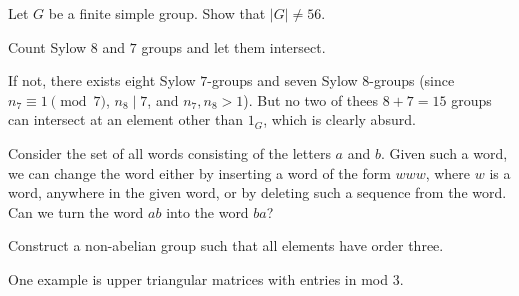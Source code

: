 \begin{problem}
	Let $G$ be a finite simple group.
	Show that $\left\lvert G \right\rvert \neq 56$.
	\begin{hint}
		Count Sylow $8$ and $7$ groups and let them intersect.
	\end{hint}
	\begin{sol}
		If not, there exists eight Sylow $7$-groups and seven Sylow $8$-groups
		(since $n_7 \equiv 1 \pmod 7$, $n_8 \mid 7$, and $n_7, n_8 > 1$).
		But no two of thees $8+7=15$ groups can intersect at an element other than $1_G$,
		which is clearly absurd.
	\end{sol}
\end{problem}

\begin{problem}
	\gim
	Consider the set of all words consisting of the letters $a$ and $b$.
	Given such a word, we can change the word either
	by inserting a word of the form $www$,
	where $w$ is a word, anywhere in the given word,
	or by deleting such a sequence from the word.
	Can we turn the word $ab$ into the word $ba$?
	\begin{hint}
		Construct a non-abelian group such that all elements have order three.
	\end{hint}
	\begin{sol}
		One example is upper triangular matrices with entries in mod $3$.
	\end{sol}
\end{problem}


